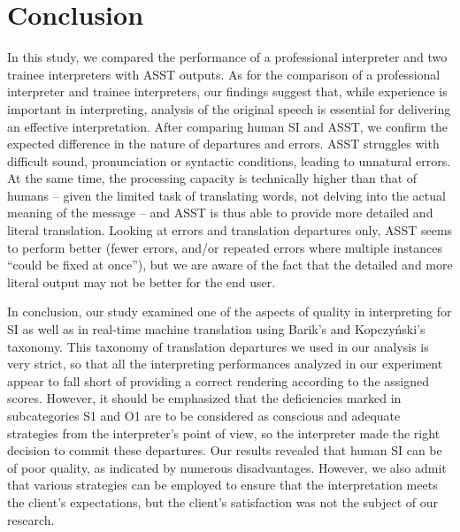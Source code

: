 \documentclass[output=paper]{langscibook}
\begin{document}
\section{Conclusion}

In this study, we compared the performance of a professional interpreter and two trainee interpreters with ASST outputs. As for the comparison of a professional interpreter and trainee interpreters, our findings suggest that, while experience is important in interpreting, analysis of the original speech is essential for delivering an effective interpretation. After comparing human SI and ASST, we confirm the expected difference in the nature of departures and errors. ASST struggles with difficult sound, pronunciation or syntactic conditions, leading to unnatural errors. At the same time, the processing capacity is technically higher than that of humans – given the limited task of translating words, not delving into the actual meaning of the message – and ASST is thus able to provide more detailed and literal translation. Looking at errors and translation departures only, ASST seems to perform better (fewer errors, and/or repeated errors where multiple instances “could be fixed at once”), but we are aware of the fact that the detailed and more literal output may not be better for the end user.

In conclusion, our study examined one of the aspects of quality in interpreting for SI as well as in real-time machine translation using Barik’s and Kopczyński’s taxonomy. This taxonomy of translation departures we used in our analysis is very strict, so that all the interpreting performances analyzed in our experiment appear to fall short of providing a correct rendering according to the assigned scores. However, it should be emphasized that the deficiencies marked in subcategories S1 and O1 are to be considered as conscious and adequate strategies from the interpreter’s point of view, so the interpreter made the right decision to commit these departures. Our results revealed that human SI can be of poor quality, as indicated by numerous disadvantages. However, we also admit that various strategies can be employed to ensure that the interpretation meets the client’s expectations, but the client’s satisfaction was not the subject of our research.
\end{document}
